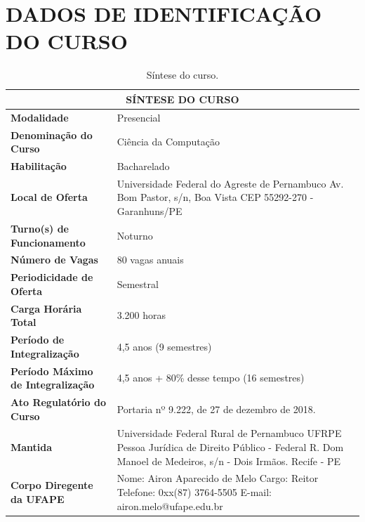 \documentclass[
	12pt,				%
	openright,			%
  oneside,     %
	a4paper,			%
	chapter=TITLE,		%
	english,			%
	french,				%
	spanish,			%
	brazil				%
	]{abntex2}
\begin{document}
\chapter*[Dados de Identificação do Curso]{DADOS DE IDENTIFICAÇÃO DO CURSO}


\begin{center}
  \begin{footnotesize} 
  \begin{longtable}{lp{9.4cm}}
    \caption{\label{quadro:sintese-do-curso}Síntese do curso.}\\
    \toprule
    \multicolumn{2}{c}{\bfseries SÍNTESE DO CURSO} \\
    \midrule
    \textbf{Modalidade} & Presencial \\ \midrule
    \textbf{Denominação do Curso}	& Ciência da Computação \\ \midrule
    \textbf{Habilitação}	& Bacharelado \\ \midrule
    \textbf{Local de Oferta}	& Universidade Federal do Agreste de Pernambuco \newline Av. Bom Pastor, s/n, Boa Vista \newline CEP 55292-270 - Garanhuns/PE \\ \midrule
    \textbf{Turno(s) de Funcionamento}	 & Noturno \\ \midrule
    \textbf{Número de Vagas}	& 80 vagas anuais \\ \midrule
    \textbf{Periodicidade de Oferta}	& Semestral \\ \midrule
    \textbf{Carga Horária Total} & 3.200 horas \\ \midrule
    \textbf{Período de Integralização}	& 4,5 anos (9 semestres) \\ \midrule
    \textbf{Período Máximo de Integralização} 	& 4,5 anos + 80\% desse tempo (16 semestres) \\ \midrule
    \textbf{Ato Regulatório do Curso} &	Portaria nº 9.222, de 27 de dezembro de 2018. \\ \midrule
    \textbf{Mantida}	& Universidade Federal Rural de Pernambuco UFRPE \newline Pessoa Jurídica de Direito Público - Federal \newline R. Dom Manoel de Medeiros, s/n - Dois Irmãos. Recife - PE \\ \midrule
    \textbf{Corpo Diregente da UFAPE}	& Nome: Airon Aparecido de Melo \newline Cargo: Reitor \newline Telefone: 0xx(87) 3764-5505 \newline E-mail: airon.melo@ufape.edu.br \\
\bottomrule
\end{longtable}
\end{footnotesize}
\end{center}
\end{document}

